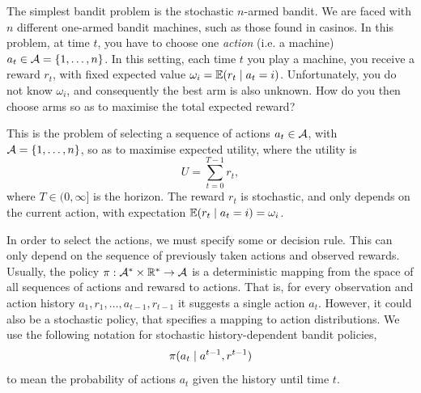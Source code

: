 The simplest bandit problem is the stochastic $n$-armed bandit. We are faced with $n$ different one-armed bandit machines, such as those found in casinos. In this problem, at time $t$, you have to choose one \emph{action} (i.e. a machine) $a_t \in {\mathcal{A}} = \left\{1, \ldots, n\right\}$. In this setting, each time $t$ you play a machine, you receive a reward $r_t$, with fixed expected value $\omega_i = \mathop{\mbox{\ensuremath{\mathbb{E}}}}\nolimits (r_t \mid a_t = i)$.
Unfortunately, you do not know $\omega_i$, and consequently the best arm is also unknown. How do you then choose arms so as to maximise the total expected reward? 
\begin{definition}
  This is the problem of selecting a sequence of actions $a_t \in {\mathcal{A}}$, with ${\mathcal{A}} = \left\{1, \ldots, n\right\}$, so as to maximise expected utility, where the utility is 
  \[
  U = \sum_{t=0}^{T - 1} r_t,
  \]
  where $T \in (0, \infty]$ is the horizon. The reward $r_t$ is stochastic,
  and only depends on the current action, with expectation $\mathop{\mbox{\ensuremath{\mathbb{E}}}}\nolimits(r_t
  \mid a_t = i) = \omega_i$.
\end{definition}
In order to select the actions, we must specify some  or decision rule. This can only depend on the sequence of previously taken actions and observed rewards. Usually, the policy $\pi :  {\mathcal{A}}^* \times {\mathbb{R}}^* \to {\mathcal{A}}$ is a deterministic mapping from the space of all sequences of actions and rewarsd to actions. That is, for every observation and action history $a_1, r_1, \ldots, a_{t-1}, r_{t-1}$ it suggests a single action $a_t$. However, it could also be a stochastic policy, that specifies a mapping to action distributions. We use the following notation for stochastic history-dependent bandit policies,
\begin{equation}
  \label{eq:history-dependent-bandit}
  \pi(a_t \mid a^{t-1}, r^{t-1})
\end{equation}
to mean the probability of actions $a_t$ given the history until time $t$.

